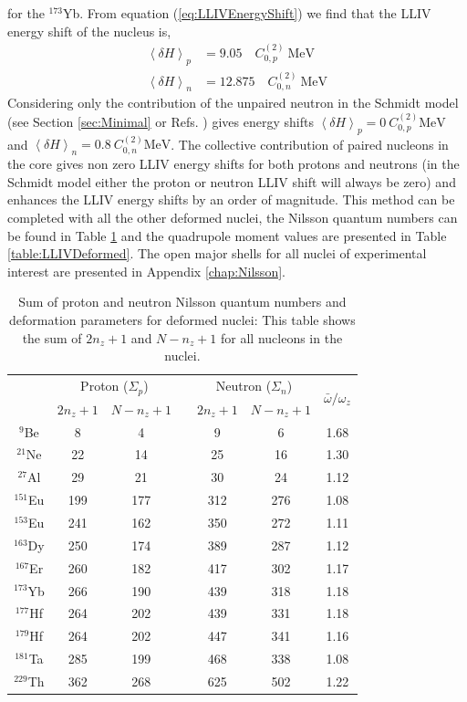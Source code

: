 \documentclass[10pt,a4paper, twoside, openright]{report}
\begin{document}
for the $^{173}$Yb. 
From equation (\ref{eq:LLIVEnergyShift}) we find that the LLIV energy shift of the nucleus is,
\begin{align*}
\left<\delta H\right>_{p} &= 9.05 \quad C^{(2)}_{0,p} \ \text{MeV} \\
\left<\delta H\right>_n &=  12.875 \quad C^{(2)}_{0,n} \ \text{MeV}
\end{align*}
Considering only the contribution of the unpaired neutron in the Schmidt model (see Section \ref{sec:Minimal} or Refs. \cite{Kostelecky1999,Flambaum2016}) gives energy shifts $\left<\delta H\right>_{p} = 0 \ C^{(2)}_{0,p} \text{MeV}$ and $\left<\delta H\right>_n = 0.8 \ C^{(2)}_{0,n} \text{MeV}$. The collective contribution of paired nucleons in the core gives non zero LLIV energy shifts for both protons and neutrons (in the Schmidt model either the proton or neutron LLIV shift will always be zero) and enhances the LLIV energy shifts by an order of magnitude. This method can be completed with all the other deformed nuclei, the Nilsson quantum numbers can be found in Table \ref{table:NzNumbers} and the quadrupole moment values are presented in Table \ref{table:LLIVDeformed}. The open major shells for all nuclei of experimental interest are presented in Appendix \ref{chap:Nilsson}.\\
\linebreak
\begin{table}[h!]
\centering
\caption[Deformation parameters for deformed nuclei of interest.]{Sum of proton and neutron Nilsson quantum numbers and deformation parameters for deformed nuclei: This table shows the sum of $2n_z + 1$ and $N - n_z + 1$ for all nucleons in the nuclei.}
\begin{tabular}{ccccccc}
\toprule
\toprule
 & \multicolumn{2}{c}{Proton ($\Sigma_p$)} & & \multicolumn{2}{c}{Neutron ($\Sigma_n$)} & \multirow{2}{*}{$\bar{\omega}/\omega_z$} \\
\cline{2-3} \cline{5-6}
 & $2n_z + 1$ & $N - n_z + 1$ & & $2n_z + 1$ & $N - n_z + 1$ &  \\
\midrule
$^{9}$Be   & 8   & 4  & & 9   & 6   & 1.68\\
$^{21}$Ne  & 22  & 14 & & 25  & 16  & 1.30\\
$^{27}$Al  & 29  & 21  &  & 30  & 24  & 1.12\\
$^{151}$Eu & 199 & 177 & & 312 & 276 & 1.08\\
$^{153}$Eu & 241 & 162 & & 350 & 272 & 1.11\\
$^{163}$Dy & 250 & 174 & & 389 & 287 & 1.12\\
$^{167}$Er & 260 & 182 & & 417 & 302 & 1.17\\
$^{173}$Yb & 266 & 190 & & 439 & 318 & 1.18\\
$^{177}$Hf & 264 & 202 & & 439 & 331 & 1.18\\
$^{179}$Hf & 264 & 202 & & 447 & 341 & 1.16\\
$^{181}$Ta & 285 & 199 & & 468 & 338 & 1.08\\
$^{229}$Th & 362 & 268 & & 625 & 502 & 1.22\\
\bottomrule
\bottomrule
\end{tabular}

\label{table:NzNumbers}
\end{table}
\end{document}
